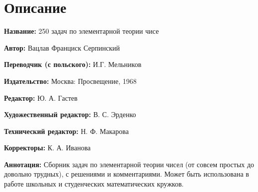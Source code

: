 \documentclass[12pt, a4paper, openany]{book}
\begin{document}
	\newpage
	
	\setcounter{secnumdepth}{0}  
	
	
		\section*{Описание}
	
	{\bf Название:} 250 задач по элементарной теории чисе
	
{\bf Автор:} Вацлав Франциск Серпинский

{\bf Переводчик (с польского):} И.Г. Мельников
	
{\bf Издательство:} Москва: Просвещение, 1968
	
		{\bf Редактор:} Ю. А. Гастев
	
		{\bf Художественный редактор:} В. С. Эрденко
	
		{\bf Технический редактор:} Н. Ф. Макарова
	
		{\bf Корректоры:} К. А. Иванова
	
		{\bf Аннотация:} Сборник задач по элементарной теории чисел (от совсем простых до довольно трудных), с решениями и комментариями. Может быть использована в работе школьных и студенческих математических кружков.
		\thispagestyle{empty} %

	
\end{document}
